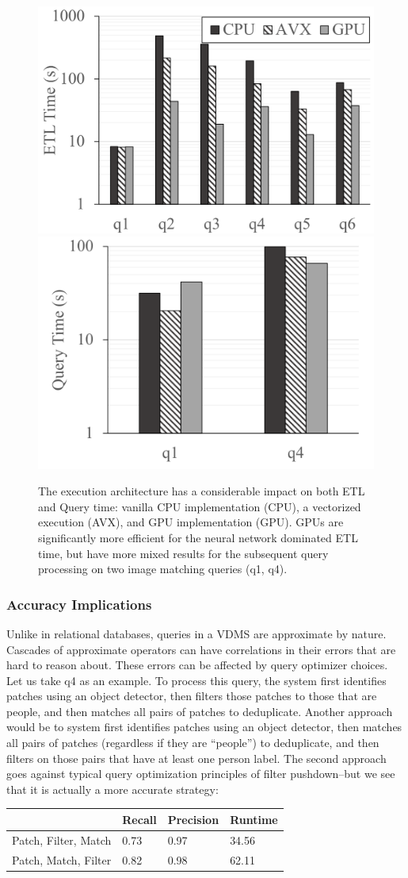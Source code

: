 \begin{figure}[t]
\centering
 \includegraphics[width=0.48\columnwidth]{figures/build.png}
  \includegraphics[width=0.48\columnwidth]{figures/build2.png}
 \caption{The execution architecture has a considerable impact on both ETL and Query time: vanilla CPU implementation (CPU), a vectorized execution (AVX), and GPU implementation (GPU). GPUs are significantly more efficient for the neural network dominated ETL time, but have more mixed results for the subsequent query processing on two image matching queries (q1, q4).  \label{build} }
\end{figure}

\subsubsection{Accuracy Implications}
Unlike in relational databases, queries in a VDMS are approximate by nature.
Cascades of approximate operators can have correlations in their errors that are hard to reason about.
These errors can be affected by query optimizer choices.
Let us take q4 as an example.
To process this query, the system first identifies patches using an object detector, then filters those patches to those that are people, and then matches all pairs of patches to deduplicate.
Another approach would be to  system first identifies patches using an object detector, then matches all pairs of patches (regardless if they are ``people'') to deduplicate, and then filters on those pairs that have at least one person label.
The second approach goes against typical query optimization principles of filter pushdown--but we see that it is actually a more accurate strategy:

\begin{table}[]
\begin{tabular}{|l|l|l|l|}
\hline
& Recall               & Precision & Runtime         \\
\hline
Patch, Filter, Match & 0.73      & 0.97    & 34.56  \\
Patch, Match, Filter & 0.82      & 0.98    & 62.11  \\
\hline
\end{tabular}
\end{table}


